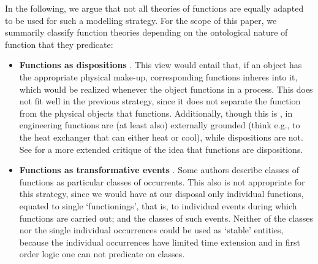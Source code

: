 \documentclass[
]{ceurart}
\begin{document}
In the following, we argue that not all theories of functions are equally adapted to be used for such a modelling strategy. 
For the scope of this paper, we summarily classify function theories depending on the ontological nature of function that they predicate:
\begin{itemize}
  \item \textbf{Functions as dispositions} \cite{arpFunctionRoleDisposition2008, barryBasicFormalOntology2015}. This view would entail that, if an object has the appropriate physical make-up, corresponding functions inheres into it, which would be realized whenever the object functions in a process. This does not fit well in the previous strategy, since it does not separate the function from the physical objects that functions. Additionally, though this is , in engineering functions are (at least also) externally grounded (think e.g., to the heat exchanger that can either heat or cool), while dispositions are not. See \cite{rohlWhyFunctionsAre2014} for a more extended critique of the idea that functions are dispositions. %
  \item \textbf{Functions as transformative events} \cite{borgoFormalizationFunctionsOperations2011, garbagarbaczTwoOntologydrivenFormalisations2011, garbaczStandardTaxonomyArtifact2005}. Some authors describe classes of functions as particular classes of occurrents. %
   This also is not appropriate  %
   for this strategy, since we would have at our disposal only individual functions, equated to single `functionings', that is, to individual events during which functions are carried out; and the classes of such events. Neither of the classes nor the single individual occurrences could be used as `stable' entities, because the individual occurrences have limited time extension and in first order logic one can not predicate on classes.

\end{itemize}
\end{document}
